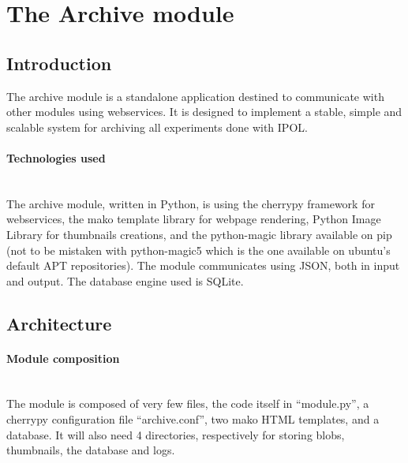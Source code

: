 \section{The Archive module}

\subsection{Introduction}
\label{sec:archive_introduction}

The archive module is a standalone application destined to communicate with other modules using webservices. It is designed to implement a stable, simple and scalable system for archiving all experiments done with IPOL.

\paragraph{Technologies used} \hspace{0pt} \\
The archive module, written in Python, is using the cherrypy framework for webservices, the mako template library for webpage rendering, Python Image Library for thumbnails creations, and the python-magic library available on pip (not to be mistaken with python-magic5 which is the one available on ubuntu's default APT repositories). The module communicates using JSON, both in input and output. The database engine used is SQLite.

\subsection{Architecture}

\paragraph{Module composition} \hspace{0pt} \\
The module is composed of very few files, the code itself in ``module.py'', a cherrypy configuration file ``archive.conf'', two mako HTML templates, and a database. It will also need 4 directories, respectively for storing blobs, thumbnails, the database and logs.

